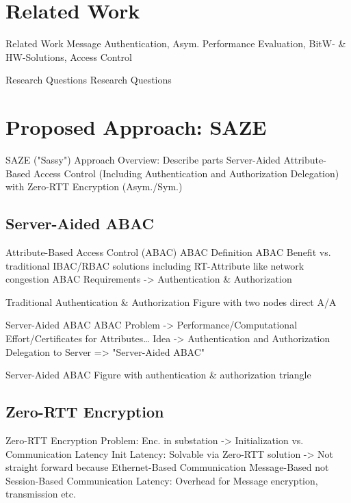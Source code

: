 \documentclass[en]{sdqbeamer}
\begin{document}
\section{Related Work}
\begin{frame}{Related Work}
    Message Authentication, Asym. Performance Evaluation, BitW- \& HW-Solutions, Access Control
\end{frame}

\begin{frame}{Research Questions}
    Research Questions
\end{frame}

\section{Proposed Approach: SAZE}
\begin{frame}{SAZE ("Sassy") Approach}
    Overview: Describe parts Server-Aided Attribute-Based Access Control (Including Authentication and Authorization Delegation) with Zero-RTT Encryption (Asym./Sym.)
\end{frame}

\subsection{Server-Aided ABAC}
\begin{frame}{Attribute-Based Access Control (ABAC)}
    ABAC Definition
    ABAC Benefit vs. traditional IBAC/RBAC solutions including RT-Attribute like network congestion
    ABAC Requirements -> Authentication \& Authorization
\end{frame}

\begin{frame}{Traditional Authentication \& Authorization}
    Figure with two nodes direct A/A
\end{frame}

\begin{frame}{Server-Aided ABAC}
    ABAC Problem -> Performance/Computational Effort/Certificates for Attributes\dots
    Idea -> Authentication and Authorization Delegation to Server => "Server-Aided ABAC"
\end{frame}

\begin{frame}{Server-Aided ABAC}
    Figure with authentication \& authorization triangle 
\end{frame}

\subsection{Zero-RTT Encryption}
\begin{frame}{Zero-RTT Encryption}
    Problem: Enc. in substation -> Initialization vs. Communication Latency
    Init Latency: Solvable via Zero-RTT solution -> Not straight forward because Ethernet-Based Communication Message-Based not Session-Based
    Communication Latency: Overhead for Message encryption, transmission etc.
\end{frame}
\end{document}
